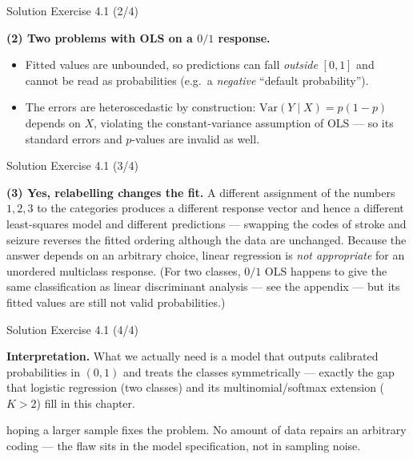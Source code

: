 \documentclass[aspectratio=169,11pt]{beamer}
\begin{document}
\begin{frame}{Solution \textemdash{} Exercise 4.1 (2/4)}
\begin{solutionbox}
\textbf{(2) Two problems with OLS on a $0/1$ response.}
\begin{itemize}
  \item Fitted values are unbounded, so predictions can fall
        \emph{outside} $[0,1]$ and cannot be read as probabilities
        (e.g.\ a \emph{negative} ``default probability'').
  \item The errors are heteroscedastic by construction:
        $\mathrm{Var}(Y\mid X)=p(1-p)$ depends on $X$, violating the
        constant-variance assumption of OLS --- so its standard errors
        and $p$-values are invalid as well.
\end{itemize}
\end{solutionbox}
\end{frame}

\begin{frame}{Solution \textemdash{} Exercise 4.1 (3/4)}
\begin{solutionbox}
\textbf{(3) Yes, relabelling changes the fit.}
A different assignment of the numbers $1,2,3$ to the categories produces
a different response vector and hence a different least-squares model
and different predictions --- swapping the codes of stroke and seizure
reverses the fitted ordering although the data are unchanged. Because
the answer depends on an arbitrary
choice, linear regression is \emph{not appropriate} for an unordered
multiclass response. (For two classes, $0/1$ OLS happens to give the
same classification as linear discriminant analysis --- see the appendix
--- but its fitted values are still not valid probabilities.)

\vspace{1mm}
\end{solutionbox}
\end{frame}

\begin{frame}{Solution \textemdash{} Exercise 4.1 (4/4)}
\begin{solutionbox}
\textbf{Interpretation.} What we actually need is a model that outputs
calibrated probabilities in $(0,1)$ and treats the classes
symmetrically --- exactly the gap that logistic regression (two
classes) and its multinomial/softmax extension ($K>2$) fill in this
chapter.
\end{solutionbox}
\begin{mistake}
hoping a larger sample fixes the problem. No
amount of data repairs an arbitrary coding --- the flaw sits in the
model specification, not in sampling noise.
\end{mistake}
\end{frame}
\end{document}
